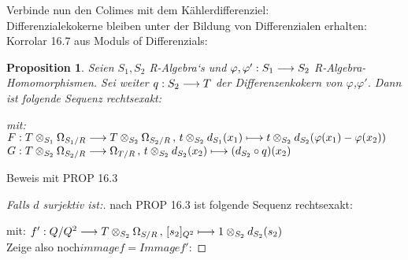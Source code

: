\documentclass[10pt,a4paper]{report}
\newtheorem{prop}[satz]{Proposition}
\newcommand{\functionfront}[3]{\nolinebreak{#1:#2 \longrightarrow #3}}
\newcommand{\function}[5]{\nolinebreak{#1:#2 \longrightarrow #3 \, , \, #4 \longmapsto #5}}
\newcommand{\divR}[2]{\Omega_{#1/#2}}
\newcommand{\tensor}[3]{#1 \otimes_{#2} #3}
\begin{document}
Verbinde nun den Colimes mit dem Kählerdifferenziel:\\
Differenzialekokerne bleiben unter der Bildung von Differenzialen erhalten:
Korrolar 16.7 aus Moduls of Differenzials:
\begin{prop}
Seien $S_1,S_2$ R-Algebra`s und $\functionfront{\varphi,\varphi'}{S_1}{S_2}$ R-Algebra-Homomorphismen. Sei weiter $\functionfront{q}{S_2}{T}$ der Differenzenkokern von $\varphi$,$\varphi '$.
Dann ist folgende Sequenz rechtsexakt:\\
\begin{center}
\end{center}
\begin{spacing}{1.5}
mit: $\function{F}{\tensor{T}{S_1}{\divR{S_1}{R}}}{\tensor{T}{S_2}{\divR{S_2}{R}}}{\tensor{t}{S_2}{d_{S_1}(x_1)}}{\tensor{t}{S_2}{d_{S_2}(\varphi(x_1) - \varphi(x_2))}}$\\
$\function{G}{\tensor{T}{S_2}{\divR{S_2}{R}}}{\divR{T}{R}}{\tensor{t}{S_2}{d_{S_2}(x_2)}}{(d_{S_2}\circ q)(x_2)}$
\end{spacing}
\end{prop}
Beweis mit PROP 16.3
\begin{proof}
[Falls $d$ surjektiv ist:] nach PROP 16.3 ist folgende Sequenz rechtsexakt:
\begin{center}
\end{center}
mit: $\function{f'}{Q/Q^2}{{\tensor{T}{S_2}{\divR{S}{R}}}}{[s_2]_{Q^2}}{\tensor{1}{S_2}{d_{S_2}(s_2)}}$\\
Zeige also noch$immage{f} = Immage{f'}$:

\end{proof}
\end{document}
